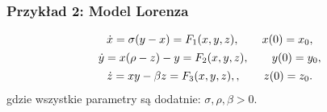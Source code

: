 \documentclass[a4paper,12pt,polish]{sphinxmanual}
\begin{document}
\subsubsection{Przykład 2: Model Lorenza}
\label{ch1/chI023:przyklad-2-model-lorenza}\label{ch1/chI023:equation-eqn58}\begin{gather}
\begin{split}\dot x = \sigma (y-x) = F_1(x, y,  z), \quad \quad x(0) = x_0,\end{split}\label{ch1/chI023-eqn58}\\\begin{split}\dot y = x(\rho - z) -y = F_2(x, y,  z),  \quad \quad y(0) = y_0,\end{split}\notag\\\begin{split}\dot z = x y - \beta z = F_3(x, y,  z), , \quad \quad z(0) = z_0.\end{split}\notag
\end{gather}
gdzie wszystkie parametry są dodatnie: $\sigma, \rho, \beta > 0$.
\end{document}

